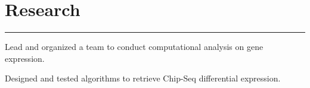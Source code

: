 \documentclass[letterpaper]{resume} %
\newcommand{\colorrule}[1]{%
\begingroup\color{#1}\hrule\endgroup%
}%
\begin{document}
\sectionspace %
\vspace{1 mm}



\section{Research}

\normalfont
\colorrule{black}
\vspace{2 mm}
\hfill
{}
\hfill
{}
\vspace{1 mm}
\begin{tightitemize}
	\item Lead and organized a team to conduct computational analysis on gene expression.
	\item Designed and tested algorithms to retrieve Chip-Seq differential expression.
\end{tightitemize}
\end{document}
